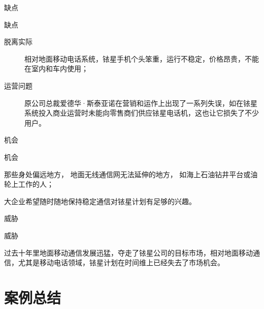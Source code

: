 \documentclass[handout]{ctexbeamer}
\begin{document}
\begin{frame}{缺点}
	\begin{alertblock}{缺点}
		\begin{description}
			\pause
		\item[脱离实际]相对地面移动电话系统，铱星手机个头笨重，运行不稳定，价格昂贵，不能在室内和车内使用；
			\pause
		\item[运营问题]原公司总裁爱德华·斯泰亚诺在营销和运作上出现了一系列失误，如在铱星系统投入商业运营时未能向零售商们供应铱星电话机，这也让它损失了不少用户。
	\end{description}
\end{alertblock}
\end{frame}

\begin{frame}{机会}
	\begin{exampleblock}{机会}
		\begin{description}
			\pause
		\item[偏远地区]那些身处偏远地方， 地面无线通信网无法延伸的地方， 如海上石油钻井平台或油轮上工作的人；
			\pause
		\item[稳定通信]大企业希望随时随地保持稳定通信对铱星计划有足够的兴趣。
	\end{description}
\end{exampleblock}
\end{frame}

\begin{frame}{威胁}
	\begin{alertblock}{威胁}
		\begin{description}
			\pause
		\item[地面通信]过去十年里地面移动通信发展迅猛，夺走了铱星公司的目标市场，相对地面移动通信，尤其是移动电话领域，铱星计划在时间维上已经失去了市场机会。
	\end{description}
\end{alertblock}
\end{frame}

\section{案例总结}%
\label{sec:案例总结}
\end{document}
